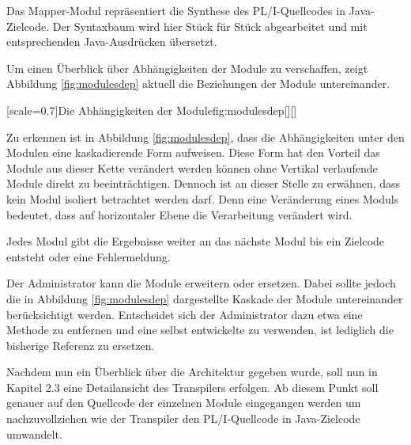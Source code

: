 Das Mapper-Modul repräsentiert die Synthese des PL/I-Quellcodes in Java-Zielcode. Der Syntaxbaum wird hier Stück für Stück abgearbeitet und mit entsprechenden Java-Ausdrücken übersetzt.

Um einen Überblick über Abhängigkeiten der Module zu verschaffen, zeigt
Abbildung \ref{fig:modulesdep} aktuell die Beziehungen der Module untereinander.

[scale=0.7]{Die Abhängigkeiten der Module}{fig:modulesdep}[][]
\pagebreak

Zu erkennen ist in Abbildung \ref{fig:modulesdep}, dass die Abhängigkeiten unter den Modulen eine kaskadierende Form aufweisen.
Diese Form hat den Vorteil das Module aus dieser Kette verändert werden können ohne Vertikal verlaufende Module direkt zu beeinträchtigen.
Dennoch ist an dieser Stelle zu erwähnen, dass kein Modul isoliert betrachtet werden darf. Denn eine Veränderung eines Moduls bedeutet, dass auf horizontaler 
Ebene die Verarbeitung verändert wird.

Jedes Modul gibt die Ergebnisse weiter an das nächste Modul bis ein Zielcode entsteht oder eine Fehlermeldung.

Der Administrator kann die Module erweitern oder ersetzen.
Dabei sollte jedoch die in Abbildung \ref{fig:modulesdep} dargestellte Kaskade der Module untereinander berücksichtigt werden.
Entscheidet sich der Administrator dazu etwa eine Methode zu entfernen und eine selbst entwickelte zu verwenden, ist lediglich die bisherige 
Referenz zu ersetzen.

Nachdem nun ein Überblick über die Architektur gegeben wurde, soll nun in Kapitel 2.3 eine Detailansicht des Transpilers erfolgen.
Ab diesem Punkt soll genauer auf den Quellcode der einzelnen Module eingegangen werden um nachzuvollziehen wie der Transpiler den PL/I-Quellcode
in Java-Zielcode umwandelt.


